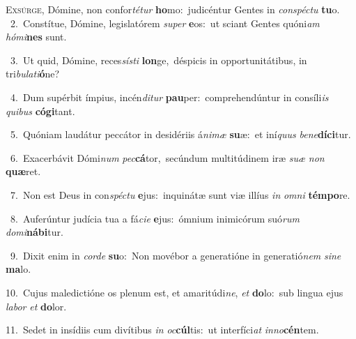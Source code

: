 \lettrine{\initial\textcolor{\initialcolor}{E}}{xsúrge,} Dómine, non confor\-\textit{té}\-\textit{tur} \textbf{ho}\-mo:~\star judicéntur Gentes in \textit{con}\-\textit{spéc}\textit{tu} \textbf{tu}\-o.\\
{\numbfont\textcolor{\numbcolor}{~2.}}~Constítue, Dómine, legislatórem \textit{su}\-\textit{per} \textbf{e}\-os:~\star ut sciant Gentes quóni\textit{am} \textit{hó}\-\textit{mi}\textbf{nes} sunt.\par
{\numbfont\textcolor{\numbcolor}{~3.}}~Ut quid, Dómine, reces\-\textit{sís}\-\textit{ti} \textbf{lon}\-ge,~\star déspicis in opportunitátibus, in tri\-\textit{bu}\-\textit{la}\textit{ti}\textbf{ó}ne?\par
{\numbfont\textcolor{\numbcolor}{~4.}}~Dum supérbit ímpius, incén\-\textit{di}\-\textit{tur} \textbf{pau}\-per:~\star comprehendúntur in consíli\textit{is} \textit{qui}\-\textit{bus} \textbf{có}\-\textbf{gi}tant.\par
{\numbfont\textcolor{\numbcolor}{~5.}}~Quóniam laudátur peccátor in desidériis á\-\textit{ni}\-\textit{mæ} \textbf{su}\-æ:~\star et iní\textit{quus} \textit{be}\-\textit{ne}\textbf{dí}\textbf{ci}tur.\par
{\numbfont\textcolor{\numbcolor}{~6.}}~Exacerbávit Dómi\textit{num} \textit{pec}\-\textbf{cá}tor,~\star secúndum multitúdinem iræ \textit{su}\-\textit{æ} \textit{non} \textbf{quæ}\-ret.\par
{\numbfont\textcolor{\numbcolor}{~7.}}~Non est Deus in con\-\textit{spéc}\-\textit{tu} \textbf{e}\-jus:~\star inquinátæ sunt viæ illíus \textit{in} \textit{om}\-\textit{ni} \textbf{tém}\-\textbf{po}re.\par
{\numbfont\textcolor{\numbcolor}{~8.}}~Auferúntur judícia tua a fá\-\textit{ci}\-\textit{e} \textbf{e}\-jus:~\star ómnium inimicórum suó\textit{rum} \textit{do}\-\textit{mi}\textbf{ná}\textbf{bi}tur.\par
{\numbfont\textcolor{\numbcolor}{~9.}}~Dixit enim in \textit{cor}\-\textit{de} \textbf{su}\-o:~\star Non movébor a generatióne in generatió\textit{nem} \textit{si}\-\textit{ne} \textbf{ma}\-lo.\par
{\numbfont\textcolor{\numbcolor}{10.}}~Cujus maledictióne os plenum est, et amaritúdi\-\textit{ne}\-, \textit{et} \textbf{do}\-lo:~\star sub lingua ejus \textit{la}\-\textit{bor} \textit{et} \textbf{do}\-lor.\par
{\numbfont\textcolor{\numbcolor}{11.}}~Sedet in insídiis cum divítibus \textit{in} \textit{oc}\-\textbf{cúl}tis:~\star ut interfíci\textit{at} \textit{in}\-\textit{no}\textbf{cén}tem.\par
